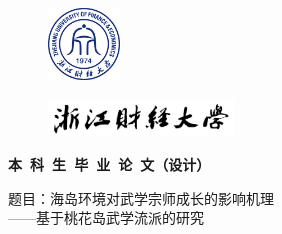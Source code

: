 \begin{titlepage}
\begin{figure}[htbp]
    \vspace{-1.3cm}
    \hspace{11.97cm}
	\includegraphics[width=1.9cm, height=1.91cm]{../figures/a01_xh.png}
\end{figure}
\begin{figure}[htbp]
    \vspace{-0.9cm}
    \hspace{10.53cm}
    \includegraphics[height=1cm]{../figures/zjcjdxxm.pdf}
\end{figure}

\begin{center}

\vspace{0.56cm}
\begin{center}
{\bf {\song{} \selectfont  本~科~生~毕~业~论~文（设计）}}
\end{center}

\vspace{3.3cm}

\begin{center}
{\heiti{} \selectfont 题目：海岛环境对武学宗师成长的影响机理 }\\
\vspace{1.4em}
{\kaishu{} \selectfont ——基于桃花岛武学流派的研究}
\end{center}


\end{center}
\end{titlepage}
